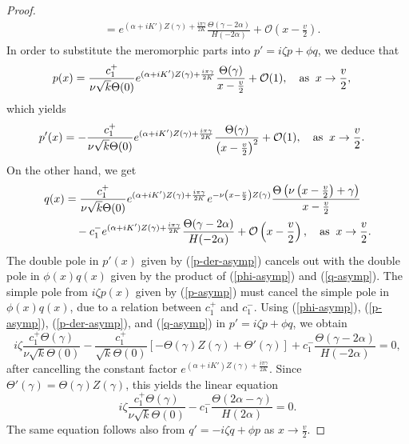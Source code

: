 \documentclass[10pt,a4paper]{amsart}
\begin{document}
\begin{proof}
\begin{align*}
&= e^{(\alpha + iK') Z(\gamma) + \frac{i \pi \gamma}{2K}} \frac{\Theta(\gamma - 2 \alpha)}{H(-2\alpha)} + \mathcal{O}\left(x - \frac{v}{2}\right).
\end{align*}
In order to substitute the meromorphic parts into $p' = i \zeta p + \phi q$, 
we deduce that 
\begin{align}
p(x) &=  \frac{c_1^+ }{ \nu \sqrt{k} \Theta(0)} 
e^{(\alpha + iK') Z(\gamma) + \frac{i \pi \gamma}{2K}} 
\frac{\Theta(\gamma)}{x - \frac{v}{2}} + \mathcal{O}(1), 
\quad \mbox{\rm as} \;\; x \to \frac{v}{2},
\label{p-asymp}
\end{align}
which yields
\begin{align}
p'(x) &= -\frac{c_1^+ }{ \nu \sqrt{k} \Theta(0)} 
e^{(\alpha + iK') Z(\gamma) + \frac{i \pi \gamma}{2K}} 
\frac{\Theta(\gamma)}{\left( x - \frac{v}{2} \right)^2} 
+ \mathcal{O}(1), 
\quad \mbox{\rm as} \;\; x \to \frac{v}{2}.
\label{p-der-asymp}
\end{align}
On the other hand, we get 
\begin{align}
q(x) &= \frac{c_1^+ }{\nu \sqrt{k}\Theta(0)} 
e^{(\alpha + iK') Z(\gamma) + \frac{i \pi \gamma}{2K}} e^{-\nu \left(x - \frac{v}{2} \right) Z(\gamma)}
\frac{\Theta\left(\nu\left(x - \frac{v}{2}\right) + \gamma \right)}{x - \frac{v}{2}} \notag \\
& \quad - c_1^- e^{(\alpha + iK') Z(\gamma) + \frac{i \pi \gamma}{2K}} \frac{\Theta(\gamma - 2 \alpha)}{H(-2\alpha)} 
+ \mathcal{O}\left(x - \frac{v}{2}\right),
\quad \mbox{\rm as} \;\; x \to \frac{v}{2}.
\label{q-asymp}
\end{align}
The double pole in $p'(x)$ given by (\ref{p-der-asymp}) 
cancels out with the double pole in $\phi(x) q(x)$ given by 
the product of (\ref{phi-asymp}) and (\ref{q-asymp}). The simple pole 
from $i \zeta p(x)$ given by (\ref{p-asymp}) must cancel 
the simple pole in $\phi(x) q(x)$, due to a relation 
between $c_1^+$ and $c_1^-$. Using (\ref{phi-asymp}), (\ref{p-asymp}), (\ref{p-der-asymp}), and (\ref{q-asymp}) in $p' = i \zeta p + \phi q$, 
we obtain 
\begin{equation*}
i \zeta \frac{c_1^+ \Theta(\gamma)}{\nu \sqrt{k} \Theta(0)} -  \frac{c_1^+ }{\sqrt{k} \Theta(0)} \left[ - \Theta(\gamma) Z(\gamma) + \Theta'(\gamma) \right] + c_1^- \frac{\Theta(\gamma - 2 \alpha)}{H(-2\alpha)} = 0, 
\end{equation*}
after cancelling the constant factor $e^{(\alpha + iK') Z(\gamma) + \frac{i \pi \gamma}{2K}}$. Since $ \Theta'(\gamma) = \Theta(\gamma) Z(\gamma)$, this yields 
the linear equation 
\begin{equation}
\label{rel-c-1}
i \zeta  \frac{c_1^+ \Theta(\gamma)}{\nu \sqrt{k} \Theta(0)} 
- c_1^- \frac{\Theta(2 \alpha - \gamma)}{H(2\alpha)} = 0.
\end{equation}
The same equation follows also from $q' = -i\zeta q + \phi p$ as $x \to \frac{v}{2}$. 


\end{proof}
\end{document}
